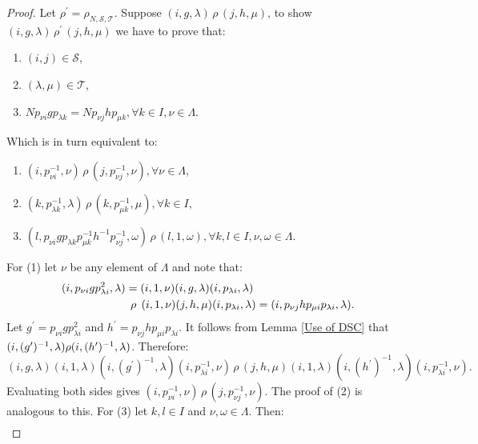 \documentclass[a4paper, 12pt,reqno]{amsart}
\theoremstyle{plain}
\theoremstyle{definition}
\theoremstyle{remark}
\newcommand{\normspace}[1]{\, #1 \,}
\newcommand{\bigspace}[1]{\hspace{4.5pt} #1 \hspace{4.5pt}}
\begin{document}
\begin{proof}
    Let $\rho^\prime = \rho_{N,\mathcal{S},\mathcal{T}}$.
    Suppose $(i,g,\lambda) \normspace{\rho} (j,h,\mu)$,
    to show $(i,g,\lambda) \normspace{\rho^\prime} (j,h,\mu)$ we have to prove that:
    \begin{enumerate}
        \item $(i,j) \in \mathcal{S}$,
        \item $(\lambda,\mu) \in \mathcal{T}$,
        \item $N p_{\nu i} g p_{\lambda k} = N p_{\nu j}hp_{\mu k}, \forall k \in I , \nu \in \Lambda$.
    \end{enumerate}
    Which is in turn equivalent to:
    \begin{enumerate}
        \item $ (i,p_{\nu i}^{-1},\nu) \normspace{\rho} (j,p_{\nu j}^{-1},\nu) ,\forall \nu \in \Lambda$,
        \item $ (k , p_{\lambda k}^{-1},\lambda) \normspace{\rho} (k,p_{\mu k}^{-1},\mu), \forall k \in I $,
        \item $ (l,p_{\nu i} g p_{\lambda k} p_{\mu k}^{-1} h^{-1} p_{\nu j}^{-1},\omega) \normspace{\rho} (l,1,\omega) , \forall k,l \in I , \nu , \omega \in \Lambda$.
    \end{enumerate}
    For (1) let $\nu$ be any element of $\Lambda$ and note that:
    \begin{align*}
        (i,p_{\nu i} g p_{\lambda i}^2,\lambda)& = (i,1,\nu)(i,g,\lambda)(i,p_{\lambda i},\lambda) \\
        & \bigspace{\rho} (i,1,\nu)(j,h,\mu)(i,p_{\lambda i},\lambda) = (i,p_{\nu j} h p_{\mu i} p_{\lambda i} , \lambda).
    \end{align*}
    Let $g^\prime = p_{\nu i} g p_{\lambda i}^2$ and $h^\prime = p_{\nu j} h p_{\mu i} p_{\lambda i}$.
    It follows from Lemma \ref{Use of DSC} that $(i,(g^\prime)^{-1},\lambda) \rho \\ (i,(h^\prime)^{-1},\lambda)$.
    Therefore:
    \begin{equation*}
        (i,g,\lambda)(i,1,\lambda)(i,(g^\prime)^{-1},\lambda)(i,p_{\lambda i}^{-1},\nu) \normspace{\rho} (j,h,\mu)(i,1,\lambda)(i,(h^\prime)^{-1},\lambda)(i,p_{\lambda i}^{-1} , \nu).
    \end{equation*}
    Evaluating both sides gives $(i,p_{\nu i}^{-1},\nu) \normspace{\rho} (j,p_{\nu j}^{-1} , \nu)$.
    The proof of (2) is analogous to this.
    For (3) let $k,l \in I$ and $\nu , \omega \in \Lambda$. Then:
    \begin{align*}

\end{align*}
\end{proof}
\end{document}
